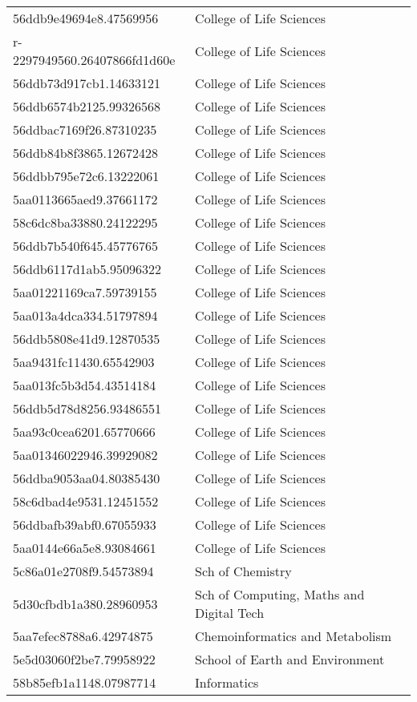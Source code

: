 \begin{tabular}{ll}
56ddb9e49694e8.47569956 & College of Life Sciences \\
r-2297949560.26407866fd1d60e & College of Life Sciences \\
56ddb73d917cb1.14633121 & College of Life Sciences \\
56ddb6574b2125.99326568 & College of Life Sciences \\
56ddbac7169f26.87310235 & College of Life Sciences \\
56ddb84b8f3865.12672428 & College of Life Sciences \\
56ddbb795e72c6.13222061 & College of Life Sciences \\
5aa0113665aed9.37661172 & College of Life Sciences \\
58c6dc8ba33880.24122295 & College of Life Sciences \\
56ddb7b540f645.45776765 & College of Life Sciences \\
56ddb6117d1ab5.95096322 & College of Life Sciences \\
5aa01221169ca7.59739155 & College of Life Sciences \\
5aa013a4dca334.51797894 & College of Life Sciences \\
56ddb5808e41d9.12870535 & College of Life Sciences \\
5aa9431fc11430.65542903 & College of Life Sciences \\
5aa013fc5b3d54.43514184 & College of Life Sciences \\
56ddb5d78d8256.93486551 & College of Life Sciences \\
5aa93c0cea6201.65770666 & College of Life Sciences \\
5aa01346022946.39929082 & College of Life Sciences \\
56ddba9053aa04.80385430 & College of Life Sciences \\
58c6dbad4e9531.12451552 & College of Life Sciences \\
56ddbafb39abf0.67055933 & College of Life Sciences \\
5aa0144e66a5e8.93084661 & College of Life Sciences \\
5c86a01e2708f9.54573894 & Sch of Chemistry \\
5d30cfbdb1a380.28960953 & Sch of Computing, Maths and Digital Tech \\
5aa7efec8788a6.42974875 & Chemoinformatics and Metabolism \\
5e5d03060f2be7.79958922 & School of Earth and Environment \\
58b85efb1a1148.07987714 & Informatics \\

\end{tabular}
